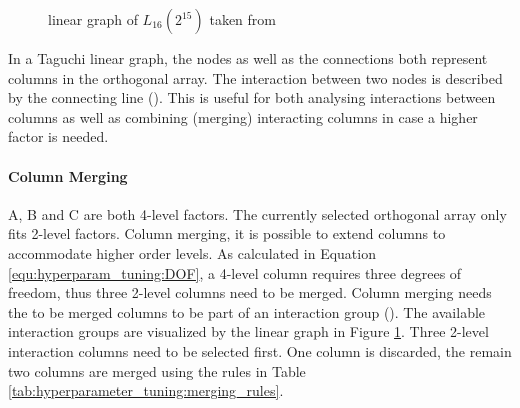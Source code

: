 \begin{figure}[H]
	\centering
	\caption{linear graph of $L_{16}(2^{15})$ taken from \cite{yang_design_2009}}
	\label{fig:hyperparameter_tuning:linear_graph}
\end{figure}

In a Taguchi linear graph, the nodes as well as the connections both represent columns in the orthogonal array. The interaction between two nodes is described by the connecting line (\cite{taguchi_taguchis_2005}). This is useful for both analysing interactions between columns as well as combining (merging) interacting columns in case a higher factor is needed.

\paragraph{Column Merging}
A, B and C are both 4-level factors. The currently selected orthogonal array only fits 2-level factors. Column merging, it is possible to extend columns to accommodate higher order levels. As calculated in Equation \ref{equ:hyperparam_tuning:DOF}, a 4-level column requires three degrees of freedom, thus three 2-level columns need to be merged. Column merging needs the to be merged columns to be part of an interaction group (\cite{yang_design_2009}). The available interaction groups are visualized by the linear graph in Figure \ref{fig:hyperparameter_tuning:linear_graph}. Three 2-level interaction columns need to be selected first. One column is discarded, the remain two columns are merged using the rules in Table \ref{tab:hyperparameter_tuning:merging_rules}.

